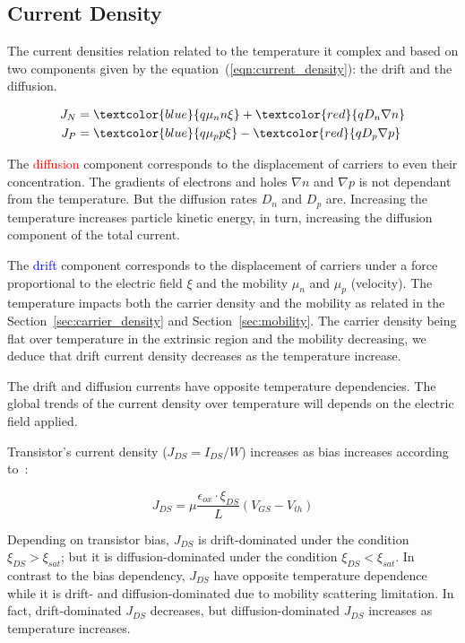 \subsection{Current Density}        %
\label{sec:current_density}
The current densities relation related to the temperature it complex and based on two components given by the equation~(\ref{eqn:current_density}): the drift and the diffusion. 

\begin{align}
\label{eqn:current_density}
J_N &= \textcolor{blue}{q\mu_n n \xi} + \textcolor{red}{qD_n\nabla n} \\
J_P &= \textcolor{blue}{q\mu_p p \xi} - \textcolor{red}{qD_p\nabla p} 
\end{align}

The \textcolor{red}{diffusion} component corresponds to the displacement of carriers to even their concentration. The gradients of electrons and holes \(\nabla n \) and \(\nabla p \) is not dependant from the temperature. But the diffusion rates \(D_n \) and \(D_p \) are. Increasing the temperature increases particle kinetic energy, in turn, increasing the diffusion component of the total current.

The \textcolor{blue}{drift} component corresponds to the displacement of carriers under a force proportional to the electric field \(\xi \) and the mobility \(\mu_n \) and \(\mu_p \) (velocity). The temperature impacts both the carrier density and the mobility as related in the Section~\ref{sec:carrier_density} and Section~\ref{sec:mobility}. The carrier density being flat over temperature in the extrinsic region and the mobility decreasing, we deduce that drift current density decreases as the temperature increase.

The drift and diffusion currents have opposite temperature dependencies. The global trends of the current density over temperature will depends on the electric field applied.

Transistor's current density (\(J_{DS} = I_{DS}/W\)) increases as bias increases according to~\cite{Sze1981}:

\begin{equation}
J_{DS} = \mu \frac{\epsilon_{ox} \cdot \xi_{DS}}{L} \left(V_{GS}-V_{th}\right)
\label{eqn:JDS}
\end{equation}

Depending on transistor bias, \(J_{DS}\) is drift-dominated under the condition \(\xi_{DS} > \xi_{sat}\); but it is diffusion-dominated under the condition \(\xi_{DS} < \xi_{sat}\). In contrast to the bias dependency, \(J_{DS}\) have opposite temperature dependence while it is drift- and \allowbreak diffusion-dominated due to mobility scattering limitation. In fact, drift-dominated \(J_{DS}\) decreases, but diffusion-dominated \(J_{DS}\) increases as temperature increases.

